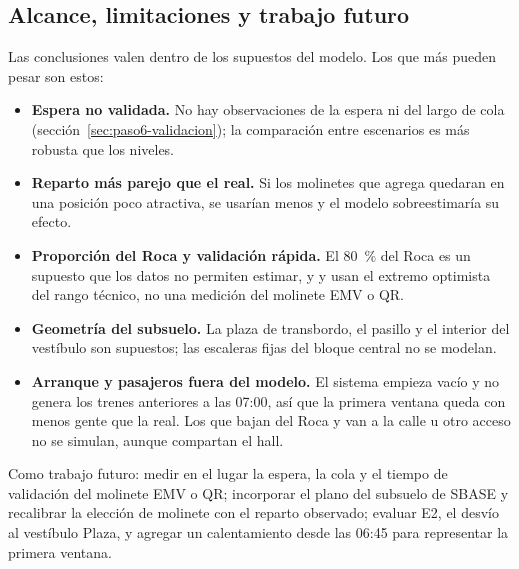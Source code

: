 \subsection{Alcance, limitaciones y trabajo futuro}

Las conclusiones valen dentro de los supuestos del modelo. Los que más pueden pesar son estos:
\begin{itemize}
  \item \textbf{Espera no validada.} No hay observaciones de la espera ni del largo de cola
        (sección~\ref{sec:paso6-validacion}); la comparación entre escenarios es más robusta que los niveles.
  \item \textbf{Reparto más parejo que el real.} Si los molinetes que agrega \EI{} quedaran en una posición poco
        atractiva, se usarían menos y el modelo sobreestimaría su efecto.
  \item \textbf{Proporción del Roca y validación rápida.} El 80~\% del Roca es un supuesto que los datos no
        permiten estimar, y \ET{} y \EIT{} usan el extremo optimista del rango técnico, no una medición del
        molinete EMV o QR.
  \item \textbf{Geometría del subsuelo.} La plaza de transbordo, el pasillo y el interior del vestíbulo son
        supuestos; las escaleras fijas del bloque central no se modelan.
  \item \textbf{Arranque y pasajeros fuera del modelo.} El sistema empieza vacío y no genera los trenes
        anteriores a las 07:00, así que la primera ventana queda con menos gente que la real. Los que bajan del
        Roca y van a la calle u otro acceso no se simulan, aunque compartan el hall.
\end{itemize}
Como trabajo futuro: medir en el lugar la espera, la cola y el tiempo de validación del molinete EMV o QR;
incorporar el plano del subsuelo de SBASE y recalibrar la elección de molinete con el reparto observado; evaluar
E2, el desvío al vestíbulo Plaza, y agregar un calentamiento desde las 06:45 para representar la primera ventana.
